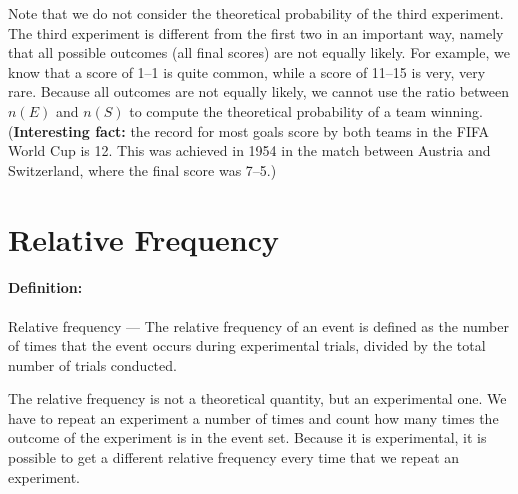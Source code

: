 \documentclass[a4paper,11pt]{report}
\def\Definition#1#2{\paragraph{Definition:} #1 --- #2}
\begin{document}
Note that we do not consider the theoretical probability of the third
experiment. The third experiment is different from the first two in an
important way, namely that all possible outcomes (all final scores)
are not equally likely. For example, we know that a score of 1--1 is
quite common, while a score of 11--15 is very, very rare. Because all
outcomes are not equally likely, we cannot use the ratio between
\(n(E)\) and \(n(S)\) to compute the theoretical probability of a team
winning. (\textbf{Interesting fact:} the record for most goals score
by both teams in the FIFA World Cup is 12. This was achieved in 1954
in the match between Austria and Switzerland, where the final score
was 7--5.)

\section{Relative Frequency}

\Definition{Relative frequency}{The relative frequency of an event is
  defined as the number of times that the event occurs during
  experimental trials, divided by the total number of trials
  conducted.}

The relative frequency is not a theoretical quantity, but an
experimental one. We have to repeat an experiment a number of times
and count how many times the outcome of the experiment is in the event
set. Because it is experimental, it is possible to get a different
relative frequency every time that we repeat an experiment.
\end{document}
